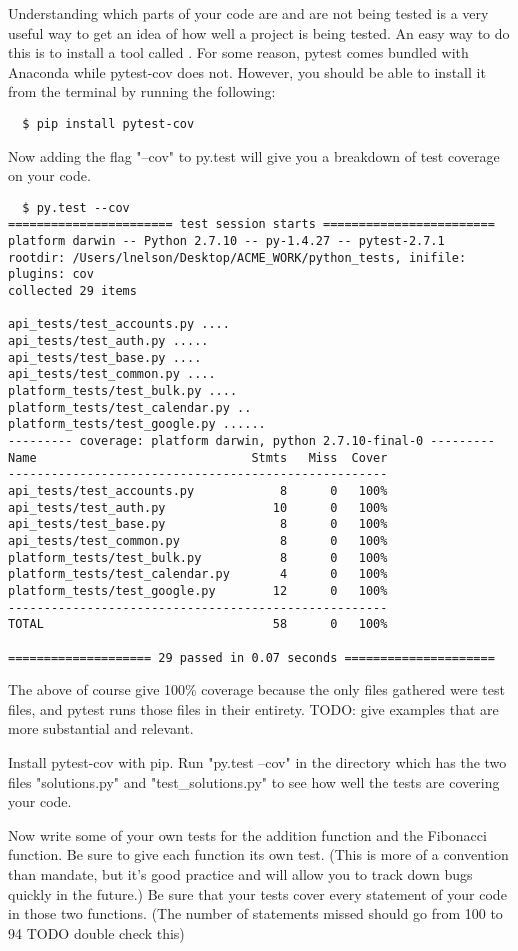 Understanding which parts of your code are and are not being tested is a very useful way to get an idea of how well a project is being tested.
An easy way to do this is to install a tool called . For some reason, pytest comes bundled with Anaconda while pytest-cov does not.  However, you should be able to install it from the terminal by running the following:
\begin{lstlisting}
  $ pip install pytest-cov
\end{lstlisting}
Now adding the flag "--cov" to py.test will give you a breakdown of test coverage on your code.
\begin{lstlisting}
  $ py.test --cov
======================= test session starts ========================
platform darwin -- Python 2.7.10 -- py-1.4.27 -- pytest-2.7.1
rootdir: /Users/lnelson/Desktop/ACME_WORK/python_tests, inifile:
plugins: cov
collected 29 items

api_tests/test_accounts.py ....
api_tests/test_auth.py .....
api_tests/test_base.py ....
api_tests/test_common.py ....
platform_tests/test_bulk.py ....
platform_tests/test_calendar.py ..
platform_tests/test_google.py ......
--------- coverage: platform darwin, python 2.7.10-final-0 ---------
Name                              Stmts   Miss  Cover
-----------------------------------------------------
api_tests/test_accounts.py            8      0   100%
api_tests/test_auth.py               10      0   100%
api_tests/test_base.py                8      0   100%
api_tests/test_common.py              8      0   100%
platform_tests/test_bulk.py           8      0   100%
platform_tests/test_calendar.py       4      0   100%
platform_tests/test_google.py        12      0   100%
-----------------------------------------------------
TOTAL                                58      0   100%

==================== 29 passed in 0.07 seconds =====================
\end{lstlisting}

The above of course give 100\% coverage because the only files gathered were test files, and pytest runs those files in their entirety.  TODO: give examples that are more substantial and relevant.

\begin{problem}
Install pytest-cov with pip.
Run "py.test --cov" in the directory which has the two files "solutions.py" and "test\_solutions.py" to see how well the tests are covering your code.

Now write some of your own tests for the addition function and the Fibonacci function. Be sure to give each function its own test. (This is more of a convention than mandate,
but it's good practice and will allow you to track down bugs quickly in the future.) Be sure that your tests cover every statement of your code in those two functions.
(The number of statements missed should go from 100 to 94 TODO double check this)
\end{problem}

